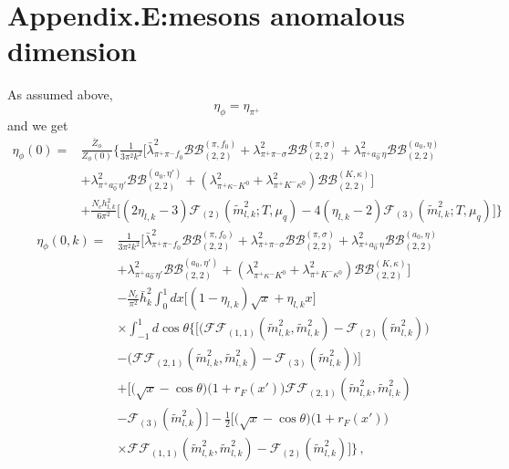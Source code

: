 \documentclass[12pt]{article}
\begin{document}
\section{Appendix.E:mesons anomalous dimension}
As assumed above,
\begin{equation}
\eta_\phi=\eta_{\pi^+}
\end{equation}
and we get
\begin{align}
\eta_{\phi}(0)=&\frac{\bar Z_{\phi}}{Z_{\phi}(0)}\bigg\{\frac{1}{3 \pi^2 k^2}\big[\bar \lambda_{\pi^+ \pi^- f_0}^2 \mathcal{BB}_{(2,2)}^{(\pi,f_0)}+\lambda_{\pi^+ \pi^- \sigma}^2 \mathcal{BB}_{(2,2)}^{(\pi,\sigma)}+\lambda_{\pi^+ a_0^- \eta}^2\mathcal{BB}_{(2,2)}^{(a_0,\eta)} \nonumber \\ 
&+\lambda_{\pi^+ a_0^- \eta'}^2\mathcal{BB}_{(2,2)}^{(a_0,\eta')} +(\lambda_{\pi^+ \kappa^- K^0}^2+\lambda_{\pi^+ K^- \kappa^0}^2)\mathcal{BB}_{(2,2)}^{(K,\kappa)}\big]\nonumber\\
&+\frac{N_c h_{l,k}^2}{6 \pi^2}\big [(2\eta_{l,k}-3)\mathcal{F}_{(2)}(
    \tilde{m}_{l,k}^{2};T,\mu_q)-4(\eta_{l,k}-2)\mathcal{F}_{(3)}(\tilde{m}_{l,k}^{2};T,\mu_q)\big]\bigg \}
\end{align}
\begin{align}
\eta_{\phi}(0,k)=&\frac{1}{3 \pi^2 k^2}\big[\bar \lambda_{\pi^+ \pi^- f_0}^2 \mathcal{BB}_{(2,2)}^{(\pi,f_0)}+\lambda_{\pi^+ \pi^- \sigma}^2 \mathcal{BB}_{(2,2)}^{(\pi,\sigma)}+\lambda_{\pi^+ a_0^- \eta}^2\mathcal{BB}_{(2,2)}^{(a_0,\eta)} \nonumber \\ 
&+\lambda_{\pi^+ a_0^- \eta'}^2\mathcal{BB}_{(2,2)}^{(a_0,\eta')} +(\lambda_{\pi^+ \kappa^- K^0}^2+\lambda_{\pi^+ K^- \kappa^0}^2)\mathcal{BB}_{(2,2)}^{(K,\kappa)}\big]\\ 
  &-\frac{N_{c}}{\pi^2}\bar h_k^2\int_0^1 d x\bigg[(1-\eta_{l,k}) \sqrt x +\eta_{l,k} x\bigg]\nonumber\\
  &\times \int_{-1}^1 d \cos \theta\Bigg\{\bigg[ \Big(\mathcal{FF}_{(1,1)}(\tilde{m}_{l,k}^{2},\tilde{m}_{l,k}^{2})-\mathcal{F}_{(2)}(\tilde{m}_{l,k}^{2}) \Big)\nonumber \\
  &-\Big(\mathcal{FF}_{(2,1)}(\tilde{m}_{l,k}^{2},\tilde{m}_{l,k}^{2})-\mathcal{F}_{(3)}(\tilde{m}_{l,k}^{2}) \Big)\bigg] \nonumber \\
  &+\bigg[\Big(\sqrt x -\cos \theta\Big)\Big(1+r_F(x')\Big)\mathcal{FF}_{(2,1)}(\tilde{m}_{l,k}^{2},\tilde{m}_{l,k}^{2})\nonumber \\
  &-\mathcal{F}_{(3)}(\tilde{m}_{l,k}^{2})\bigg]-\frac{1}{2}\bigg[\Big(\sqrt x -\cos \theta\Big)\Big(1+r_F(x')\Big)\nonumber \\
  &\times\mathcal{FF}_{(1,1)}(\tilde{m}_{l,k}^{2},\tilde{m}_{l,k}^{2})-\mathcal{F}_{(2)}(\tilde{m}_{l,k}^{2})\bigg]\Bigg\}\,,
\end{align}
\end{document}
